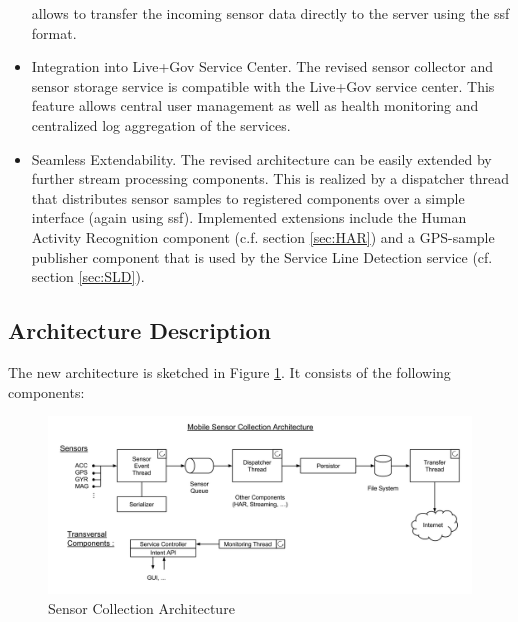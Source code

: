 \begin{itemize}
  allows to transfer the incoming sensor data directly to the server
  using the ssf format.
\item Integration into Live+Gov Service Center. The revised sensor
  collector and sensor storage service is compatible with the Live+Gov
  service center. This feature allows central user management as well
  as health monitoring and centralized log aggregation of the services.
\item Seamless Extendability. The revised architecture can be easily
  extended by further stream processing components. This is realized
  by a dispatcher thread that distributes sensor samples to registered
  components over a simple interface (again using ssf). Implemented
  extensions include the Human Activity Recognition component
  (c.f. section \ref{sec:HAR}) and a GPS-sample publisher component
  that is used by the Service Line Detection service (cf. section
  \ref{sec:SLD}).
\end{itemize}

\subsection{Architecture Description}

The new architecture is sketched in Figure \ref{fig:sc_architecture}.
It consists of the following components:

\begin{figure}[h]
\centering
\includegraphics[width=\textwidth]{img/sc/sc_architecture.png}
\caption{Sensor Collection Architecture}\label{fig:sc_architecture}
\end{figure}


